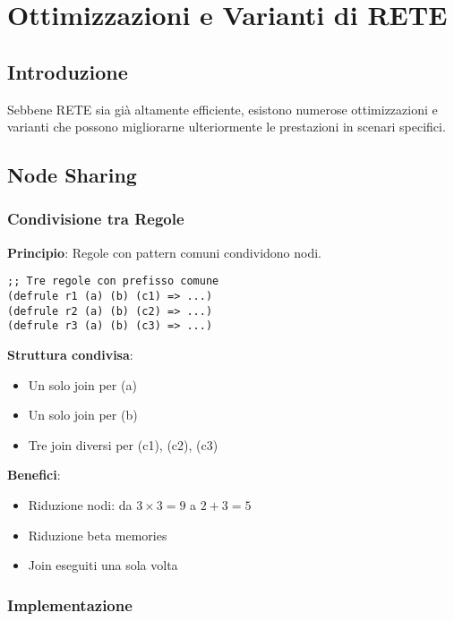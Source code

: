 
\chapter{Ottimizzazioni e Varianti di RETE}
\label{cap:rete_ottimizzazioni}

\section{Introduzione}

Sebbene RETE sia già altamente efficiente, esistono numerose ottimizzazioni e varianti che possono migliorarne ulteriormente le prestazioni in scenari specifici.

\section{Node Sharing}

\subsection{Condivisione tra Regole}

\textbf{Principio}: Regole con pattern comuni condividono nodi.

\begin{lstlisting}[language=CLIPS]
;; Tre regole con prefisso comune
(defrule r1 (a) (b) (c1) => ...)
(defrule r2 (a) (b) (c2) => ...)
(defrule r3 (a) (b) (c3) => ...)
\end{lstlisting}

\textbf{Struttura condivisa}:
\begin{itemize}
\item Un solo join per (a)
\item Un solo join per (b)
\item Tre join diversi per (c1), (c2), (c3)
\end{itemize}

\textbf{Benefici}:
\begin{itemize}
\item Riduzione nodi: da $3 \times 3 = 9$ a $2 + 3 = 5$
\item Riduzione beta memories
\item Join eseguiti una sola volta
\end{itemize}

\subsection{Implementazione}

